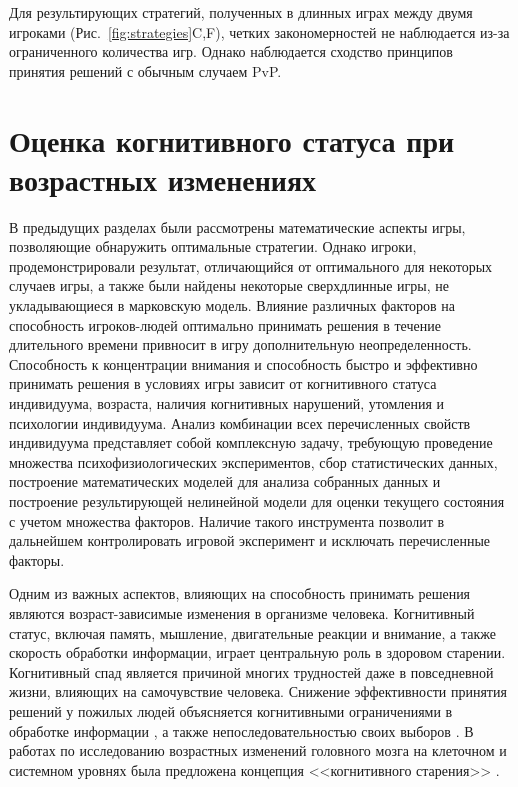 Для результирующих стратегий, полученных в длинных играх между двумя игроками (Рис.~\cref{fig:strategies}C,F), четких закономерностей не наблюдается из-за ограниченного количества игр. Однако наблюдается сходство принципов принятия решений с обычным случаем PvP.

\section{Оценка когнитивного статуса при возрастных изменениях}\label{sec:ch3/sec5}

В предыдущих разделах были рассмотрены математические аспекты игры, позволяющие обнаружить оптимальные стратегии. Однако игроки, продемонстрировали результат, отличающийся от оптимального для некоторых случаев игры, а также были найдены некоторые сверхдлинные игры, не укладывающиеся в марковскую модель. Влияние различных факторов на способность игроков-людей оптимально принимать решения в течение длительного времени привносит в игру дополнительную неопределенность. Способность к концентрации внимания и способность быстро и эффективно принимать решения в условиях игры зависит от когнитивного статуса индивидуума, возраста, наличия когнитивных нарушений, утомления и психологии индивидуума. Анализ комбинации всех перечисленных свойств индивидуума представляет собой комплексную задачу, требующую проведение множества психофизиологических экспериментов, сбор статистических данных, построение математических моделей для анализа собранных данных и построение результирующей нелинейной модели для оценки текущего состояния с учетом множества факторов. Наличие такого инструмента позволит в дальнейшем контролировать игровой эксперимент и исключать перечисленные факторы. 

Одним из важных аспектов, влияющих на способность принимать решения являются возраст-зависимые изменения в организме человека. Когнитивный статус, включая память, мышление, двигательные реакции и внимание, а также скорость обработки информации, играет центральную роль в здоровом старении. Когнитивный спад является причиной многих трудностей даже в повседневной жизни, влияющих на самочувствие человека. Снижение эффективности принятия решений у пожилых людей объясняется когнитивными ограничениями в обработке информации \cite{frey_role_2015}, а также непоследовательностью своих выборов \cite{finucane_task_2005}. В работах по исследованию возрастных изменений головного мозга на клеточном и системном уровнях была предложена концепция <<когнитивного старения>> \cite{blazer_cognitive_2017}.

